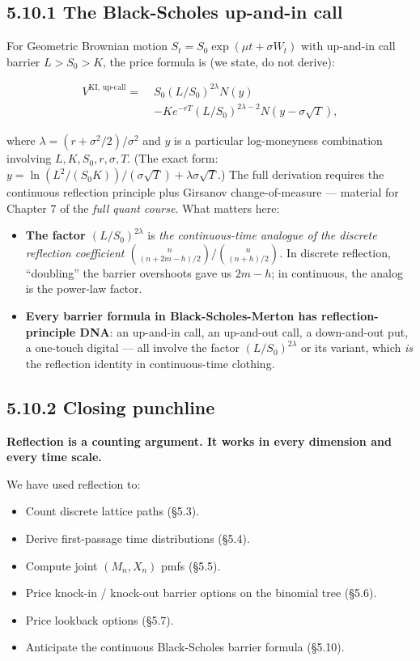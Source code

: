 \documentclass[
  10pt,
  twoside]{book}
\providecommand{\tightlist}{%
  \setlength{\itemsep}{0pt}\setlength{\parskip}{0pt}}
\begin{document}
\subsection{5.10.1 The Black-Scholes up-and-in
call}\label{the-black-scholes-up-and-in-call}

For Geometric Brownian motion \(S_t = S_0 \exp(\mu t + \sigma W_t)\)
with up-and-in call barrier \(L > S_0 > K\), the price formula is (we
state, do not derive):

\[\begin{aligned}
V^{\text{KI, up-call}} = \; & S_0 (L/S_0)^{2\lambda} N(y) \\
& - K e^{-rT} (L/S_0)^{2\lambda - 2} N(y - \sigma\sqrt T),
\end{aligned}\]

where \(\lambda = (r + \sigma^2/2)/\sigma^2\) and \(y\) is a particular
log-moneyness combination involving \(L, K, S_0, r, \sigma, T\). (The
exact form:
\(y = \ln(L^2 / (S_0 K)) / (\sigma\sqrt T) + \lambda \sigma\sqrt T\).)
The full derivation requires the continuous reflection principle plus
Girsanov change-of-measure --- material for Chapter 7 of the \emph{full
quant course}. What matters here:

\begin{itemize}
\tightlist
\item
  \textbf{The factor \((L/S_0)^{2\lambda}\)} is \emph{the
  continuous-time analogue of the discrete reflection coefficient
  \(\binom{n}{(n + 2m - h)/2}/\binom{n}{(n+h)/2}\).} In discrete
  reflection, ``doubling'' the barrier overshoots gave us \(2m - h\); in
  continuous, the analog is the power-law factor.
\item
  \textbf{Every barrier formula in Black-Scholes-Merton has
  reflection-principle DNA}: an up-and-in call, an up-and-out call, a
  down-and-out put, a one-touch digital --- all involve the factor
  \((L/S_0)^{2\lambda}\) or its variant, which \emph{is} the reflection
  identity in continuous-time clothing.
\end{itemize}

\subsection{5.10.2 Closing punchline}\label{closing-punchline}

\textbf{Reflection is a counting argument. It works in every dimension
and every time scale.}

We have used reflection to:

\begin{itemize}
\tightlist
\item
  Count discrete lattice paths (§5.3).
\item
  Derive first-passage time distributions (§5.4).
\item
  Compute joint \((M_n, X_n)\) pmfs (§5.5).
\item
  Price knock-in / knock-out barrier options on the binomial tree
  (§5.6).
\item
  Price lookback options (§5.7).
\item
  Anticipate the continuous Black-Scholes barrier formula (§5.10).
\end{itemize}
\end{document}
